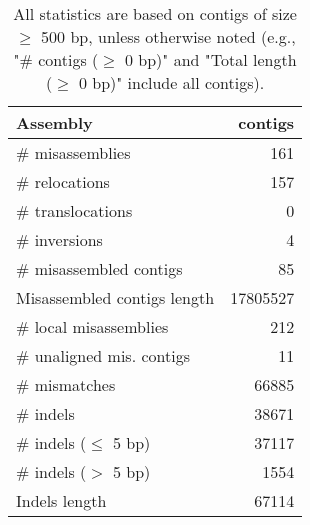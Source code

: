 \documentclass[12pt,a4paper]{article}
\begin{document}
\begin{table}[ht]
\begin{center}
\caption{All statistics are based on contigs of size $\geq$ 500 bp, unless otherwise noted (e.g., "\# contigs ($\geq$ 0 bp)" and "Total length ($\geq$ 0 bp)" include all contigs).}
\begin{tabular}{|l*{1}{|r}|}
\hline
Assembly & contigs \\ \hline
\# misassemblies & 161 \\ \hline
\hspace{5mm}\# relocations & 157 \\ \hline
\hspace{5mm}\# translocations & 0 \\ \hline
\hspace{5mm}\# inversions & 4 \\ \hline
\# misassembled contigs & 85 \\ \hline
Misassembled contigs length & 17805527 \\ \hline
\# local misassemblies & 212 \\ \hline
\# unaligned mis. contigs & 11 \\ \hline
\# mismatches & 66885 \\ \hline
\# indels & 38671 \\ \hline
\hspace{5mm}\# indels ($\leq$ 5 bp) & 37117 \\ \hline
\hspace{5mm}\# indels ($>$ 5 bp) & 1554 \\ \hline
Indels length & 67114 \\ \hline
\end{tabular}
\end{center}
\end{table}
\end{document}
